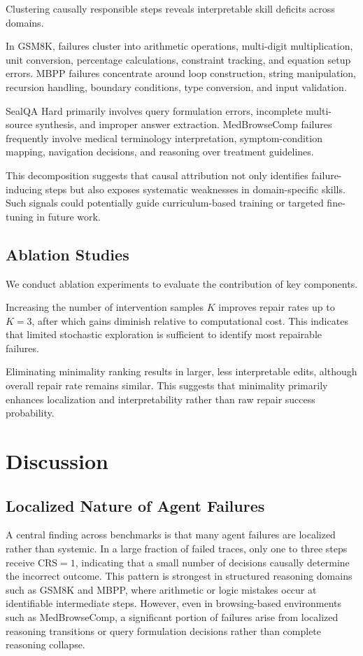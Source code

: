 \documentclass{article}
\theoremstyle{plain}
\theoremstyle{definition}
\theoremstyle{remark}
\begin{document}
Clustering causally responsible steps reveals interpretable skill deficits across domains.

In GSM8K, failures cluster into arithmetic operations, multi-digit multiplication, unit conversion, percentage calculations, constraint tracking, and equation setup errors. MBPP failures concentrate around loop construction, string manipulation, recursion handling, boundary conditions, type conversion, and input validation.

SealQA Hard primarily involves query formulation errors, incomplete multi-source synthesis, and improper answer extraction. MedBrowseComp failures frequently involve medical terminology interpretation, symptom-condition mapping, navigation decisions, and reasoning over treatment guidelines.

This decomposition suggests that causal attribution not only identifies failure-inducing steps but also exposes systematic weaknesses in domain-specific skills. Such signals could potentially guide curriculum-based training or targeted fine-tuning in future work.

\subsection{Ablation Studies}

We conduct ablation experiments to evaluate the contribution of key components.

Increasing the number of intervention samples $K$ improves repair rates up to $K=3$, after which gains diminish relative to computational cost. This indicates that limited stochastic exploration is sufficient to identify most repairable failures.

Eliminating minimality ranking results in larger, less interpretable edits, although overall repair rate remains similar. This suggests that minimality primarily enhances localization and interpretability rather than raw repair success probability.

\section{Discussion}

\subsection{Localized Nature of Agent Failures}

A central finding across benchmarks is that many agent failures are localized rather than systemic. In a large fraction of failed traces, only one to three steps receive $\mathrm{CRS}=1$, indicating that a small number of decisions causally determine the incorrect outcome. This pattern is strongest in structured reasoning domains such as GSM8K and MBPP, where arithmetic or logic mistakes occur at identifiable intermediate steps. However, even in browsing-based environments such as MedBrowseComp, a significant portion of failures arise from localized reasoning transitions or query formulation decisions rather than complete reasoning collapse.
\end{document}
